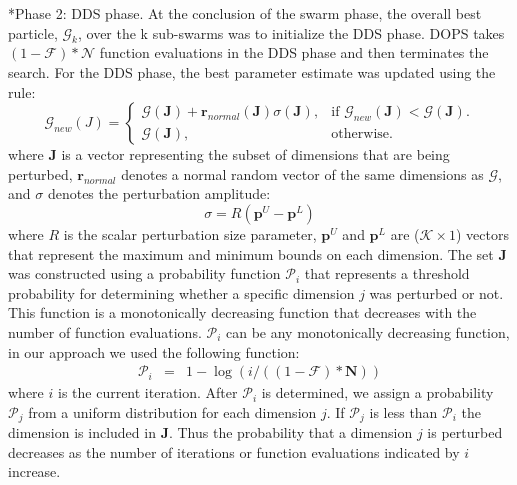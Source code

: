 \documentclass[12pt]{article}
\makeatletter
\renewcommand\subsubsection{\@startsection
	{subsubsection}{2}{0mm}
	{-0.05in}
	{-0.5\baselineskip}
	{\normalfont\normalsize\itshape}}
\makeatother
\begin{document}
\subsubsection*{Phase 2: DDS phase.}
At the conclusion of the swarm phase, the overall best particle, $\mathcal{G}_{k}$, over the k sub-swarms was to initialize the DDS phase.
DOPS takes $\left(1-\mathcal{F}\right)*\mathcal{N}$ function evaluations in the DDS phase and then terminates the search.
For the DDS phase, the best parameter estimate was updated using the rule:
\begin{equation}
  \mathcal{G}_{new}({J})=\begin{cases}
    \mathcal{G}(\mathbf{J})+\mathbf{r}_{normal}(\mathbf{J})\sigma(\mathbf{J}), & \text{if $\mathcal{G}_{new}(\mathbf{J})<\mathcal{G}(\mathbf{J})$}.\\
    \mathcal{G}(\mathbf{J}), & \text{otherwise}.
  \end{cases}
\end{equation}
where $\mathbf{J}$ is a vector representing the subset of dimensions that are being perturbed, $\mathbf{r}_{normal}$ denotes a normal random vector of the same dimensions as $\mathcal{G}$,
and $\sigma$ denotes the perturbation amplitude:
\begin{equation}
	\sigma = {R}(\mathbf{p}^U - \mathbf{p}^L)
\end{equation}
where ${R}$ is the scalar perturbation size parameter, $\mathbf{p}^U$ and $\mathbf{p}^L$ are ($\mathcal{K}\times{1}$) vectors that represent the maximum and minimum bounds on each dimension. The set $\mathbf{J}$ was constructed using a probability function $\mathcal{P}_{i}$ that represents a threshold probability for determining whether a specific dimension $j$ was perturbed or not.  This function is a monotonically decreasing function that decreases with the number of function evaluations. $\mathcal{P}_{i}$ can be any monotonically decreasing function, in our approach we used the following function:
\begin{eqnarray}
	\mathcal{P}_{i}&=&{1}-\log(i/ (({1}-\mathcal{F})*\mathbf{N}))
\end{eqnarray}
where $i$ is the current iteration. After $\mathcal{P}_{i}$ is determined, we assign a probability $\mathcal{P}_{j}$ from a uniform distribution for each dimension $j$. If $\mathcal{P}_{j}$ is less than $\mathcal{P}_{i}$ the dimension is included in \textbf{J}. Thus the probability that a dimension $j$ is perturbed decreases as the number of iterations or function evaluations indicated by $i$ increase.
\end{document}
